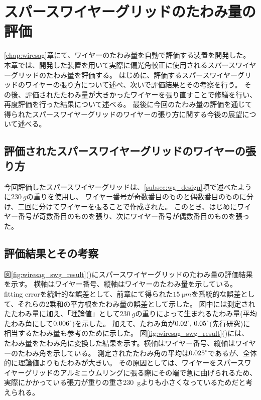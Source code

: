\documentclass[../../main.tex]{subfiles}
\begin{document}
\chapter{スパースワイヤーグリッドのたわみ量の評価}
\label{chap:wiresag_swg}
\ref{chap:wiresag}章にて、ワイヤーのたわみ量を自動で評価する装置を開発した。
本章では、開発した装置を用いて実際に偏光角較正に使用されるスパースワイヤーグリッドのたわみ量を評価する。
はじめに、評価するスパースワイヤーグリッドのワイヤーの張り方について述べ、次いで評価結果とその考察を行う。
その後、評価されたたわみ量が大きかったワイヤーを張り直すことで修繕を行い、再度評価を行った結果について述べる。
最後に今回のたわみ量の評価を通じて得られたスパースワイヤーグリッドのワイヤーの張り方に関する今後の展望について述べる。

\section{評価されたスパースワイヤーグリッドのワイヤーの張り方}
今回評価したスパースワイヤーグリッドは、\ref{subsec:wg_design}項で述べたように$\SI{230}{g}$の重りを使用し、
ワイヤー番号が奇数番目のものと偶数番目のものに分け、二回に分けてワイヤーを張ることで作成された。
このとき、はじめにワイヤー番号が奇数番目のものを張り、次にワイヤー番号が偶数番目のものを張った。

\section{評価結果とその考察}
図\ref{fig:wiresag_swg_result}()にスパースワイヤーグリッドのたわみ量の評価結果を示す。
横軸はワイヤー番号、縦軸はワイヤーのたわみ量を示している。
fitting errorを統計的な誤差として、前章にて得られた$\SI{15}{\micro m}$を系統的な誤差として、それらの2乗和の平方根をたわみ量の誤差として示した。
図中には測定されたたわみ量に加え、「理論値」として$\SI{230}{g}$の重りによって生まれるたわみ量(平均たわみ角にして$0.006\tcdegree$)を示した。
加えて、たわみ角が$0.02\tcdegree,\,0.05\tcdegree$(先行研究\cite{swg:murata}\cite{swg:iijima})に相当するたわみ量も参考のために示した。
図\ref{fig:wiresag_swg_result}()には、
たわみ量をたわみ角に変換した結果を示す。横軸はワイヤー番号、縦軸はワイヤーのたわみ角を示している。
測定されたたわみ角の平均は$0.025\tcdegree$であるが、全体的に理論値よりもたわみが大きい。
その原因としては、ワイヤーをスパースワイヤーグリッドのアルミニウムリングに張る際にその端で急に曲げられるため、
実際にかかっている張力が重りの重さ\SI{230}{g}よりも小さくなっているためだと考えられる。
\end{document}
